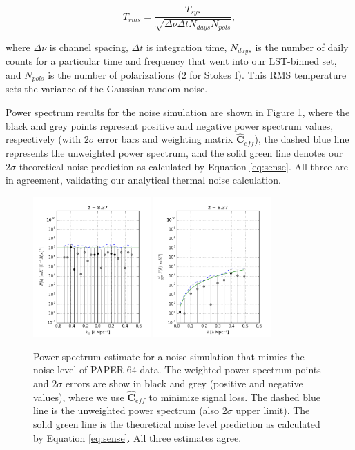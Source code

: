 \documentclass[preprint2,numberedappendix,tighten]{aastex6}  %
\begin{document}
\begin{equation}
T_{rms} = \frac{T_{sys}}{\sqrt{\Delta\nu \Delta t N_{days} N_{pols}}},
\end{equation}

\noindent where $\Delta\nu$ is channel spacing, $\Delta t$ is integration time, $N_{days}$ is the number of daily counts for a particular time and frequency that went into our LST-binned set, and $N_{pols}$ is the number of polarizations ($2$ for Stokes I). This RMS temperature sets the variance of the Gaussian random noise.

Power spectrum results for the noise simulation are shown in Figure \ref{fig:ps_noise}, where the black and grey points represent positive and negative power spectrum values, respectively (with $2\sigma$ error bars and weighting matrix $\hat{\textbf{C}}_{eff}$), the dashed blue line represents the unweighted power spectrum, and the solid green line denotes our $2\sigma$ theoretical noise prediction as calculated by Equation \eqref{eq:sense}. All three are in agreement, validating our analytical thermal noise calculation. 

\begin{figure}
	\centering
	\includegraphics[width=0.4\textwidth]{plots/ps1_noise_reg.png}
	\includegraphics[width=0.4\textwidth]{plots/ps2_noise_reg.png}
	\caption{Power spectrum estimate for a noise simulation that mimics the noise level of PAPER-64 data. The weighted power spectrum points and $2\sigma$ errors are show in black and grey (positive and negative values), where we use $\hat{\textbf{C}}_{eff}$ to minimize signal loss. The dashed blue line is the unweighted power spectrum (also $2\sigma$ upper limit). The solid green line is the theoretical noise level prediction as calculated by Equation \eqref{eq:sense}. All three estimates agree.}
	\label{fig:ps_noise}
\end{figure}
\end{document}
